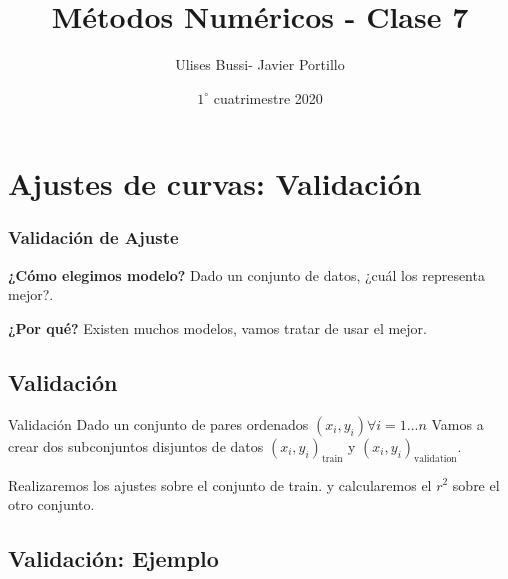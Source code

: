 \documentclass[xcolor=svgnames]{beamer} %
\title{Métodos Numéricos - Clase 7}
\author{Ulises Bussi- Javier Portillo}
\date{ $1^\circ$ cuatrimestre 2020}
\theoremstyle{plain}
\renewcommand{\textbf}[1]{{\bfseries\textcolor{redUnq2}{#1}}}
\theoremstyle{definition}
\begin{document}
 


\begin{frame} %
	\titlepage
\end{frame}

\begin{frame}
\tableofcontents
\end{frame}


\section{Ajustes de curvas: Validación}

\begin{frame}
\frametitle{Validación de Ajuste}

\vspace{10pt}


\begin{tcolorbox}
\textbf{¿Cómo elegimos modelo?}
Dado un conjunto de datos, ¿cuál los representa mejor?.
\end{tcolorbox} \vspace{20pt}

\textbf{¿Por qué?}
\pause
Existen muchos modelos, vamos tratar de usar el mejor.


\end{frame}

\subsection{Validación}

\begin{frame}{Validación}
 Dado un conjunto de pares ordenados $(x_i,y_i) \forall i=1...n$ Vamos a crear dos subconjuntos disjuntos de datos $(x_i,y_i)_{\text{train}}$ y $(x_i,y_i)_{\text{validation}}$. \vspace{20pt}
 
 Realizaremos los ajustes sobre el conjunto de train. y calcularemos el $r^2$ sobre el otro conjunto. 
\end{frame}

\subsection{Validación: Ejemplo}
\end{document}
